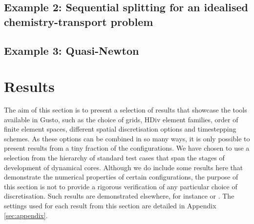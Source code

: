 \documentclass[journal abbreviation, manuscript]{copernicus}
\begin{document}
\subsection{Example 2: Sequential splitting for an idealised chemistry-transport problem} \label{sec:seq splitting}



\subsection{Example 3: Quasi-Newton } \label{sec:siqn}



\section{Results}
\label{sec: results}
The aim of this section is to present a selection of results that
showcase the tools available in Gusto, such as the choice of grids,
HDiv element families, order of finite element spaces, different
spatial discretisation options and timestepping schemes.
As these options can be combined in so many ways, it is only possible to present results from a tiny fraction of the configurations.
We have chosen to use a selection from the hierarchy of standard test cases that span the stages of development of dynamical cores.
Although we do include some results here that demonstrate the numerical properties of certain configurations, the purpose of this section is not to provide a rigorous verification of any particular choice of discretisation. Such results are demonstrated elsewhere, for instance \citet{bendall2020compatible} or \citet{hartney2025exploring}.
The settings used for each result from this section are detailed in Appendix \ref{sec:appendix}.
\end{document}
